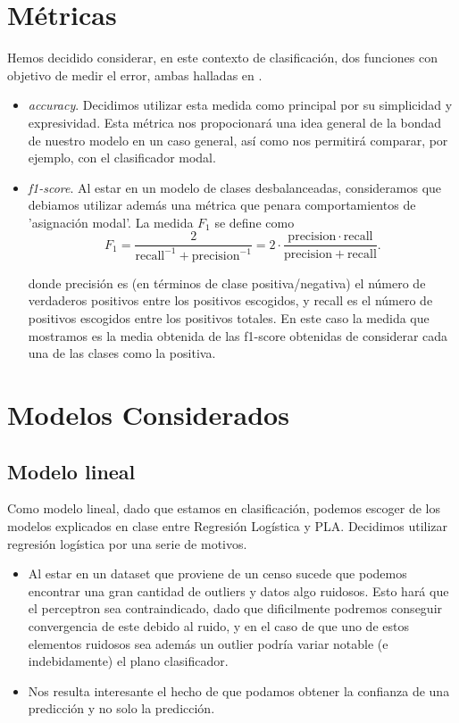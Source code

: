 \documentclass[11pt,a4paper]{article}
\begin{document}
\section{ Métricas }

Hemos decidido considerar, en este contexto de clasificación, dos funciones con objetivo de medir el error, ambas halladas en \cite{met}.
\begin{itemize}
	\item \emph{accuracy}. Decidimos utilizar esta medida como principal por su simplicidad y expresividad. Esta métrica nos propocionará una idea general de la bondad de nuestro modelo en un caso general, así como nos permitirá comparar, por ejemplo, con el clasificador modal. 
	\item \emph{f1-score}. Al estar en un modelo de clases desbalanceadas, consideramos que debiamos utilizar además una métrica que penara comportamientos de 'asignación modal'. La medida $F_1$ se define como\cite{f1}
	$${\displaystyle F_{1}={\frac {2}{\mathrm {recall} ^{-1}+\mathrm {precision} ^{-1}}}=2\cdot {\frac {\mathrm {precision} \cdot \mathrm {recall} }{\mathrm {precision} +\mathrm {recall} }}}.$$
	
	donde precisión es (en términos de clase positiva/negativa) el número de verdaderos positivos entre los positivos escogidos, y recall es el número de positivos escogidos entre los positivos totales. En este caso la medida que mostramos es la media obtenida de las f1-score obtenidas de considerar cada una de las clases como la positiva.
\end{itemize}
\section{ Modelos Considerados }

\subsection{ Modelo lineal }
	
	Como modelo lineal, dado que estamos en clasificación, podemos escoger de los modelos explicados en clase entre Regresión Logística y  PLA. Decidimos utilizar regresión logística por una serie de motivos.
	
	\begin{itemize}
	\item Al estar en un dataset que proviene de un censo sucede que podemos encontrar una gran cantidad de outliers y datos algo ruidosos. Esto hará que el perceptron sea contraindicado, dado que dificilmente podremos conseguir convergencia de este debido al ruido, y en el caso de que uno de estos elementos ruidosos sea además un outlier podría variar notable (e indebidamente) el plano clasificador.
	\item Nos resulta interesante el hecho de que podamos obtener la confianza de una predicción y no solo la predicción.
\end{itemize}
\end{document}
